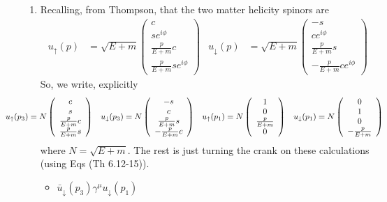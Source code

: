 \begin{enumerate}[label=\alph*)]
	\item Recalling, from Thompson, that the two matter helicity spinors are
	\begin{align}
	u_{\uparrow}(p)&=\sqrt{E+m}\left(\begin{array}{c} c\\se^{i\phi} \\\tfrac{p}{E+m}c \\\tfrac{p}{E+m}se^{i\phi} \end{array}\right) & u_{\downarrow}(p)&=\sqrt{E+m}\left(\begin{array}{c}-s\\ ce^{i\phi} \\\tfrac{p}{E+m}s \\ -\tfrac{p}{E+m}ce^{i\phi} \end{array}\right)
	\end{align}
	So, we write, explicitly 
	\begin{align}
	\hspace{-1.5cm} u_{\uparrow}(p_{3})&=N\left(\begin{array}{c} c\\s \\\tfrac{p}{E+m}c \\\tfrac{p}{E+m}s \end{array}\right) & u_{\downarrow}(p_{3})&=N\left(\begin{array}{c}-s\\ c \\\tfrac{p}{E+m}s \\ -\tfrac{p}{E+m}c \end{array}\right)&u_{\uparrow}(p_{1})&=N\left(\begin{array}{c} 1\\ 0 \\\tfrac{p}{E+m} \\ 0 \end{array}\right) & u_{\downarrow}(p_{1})&=N\left(\begin{array}{c} 0 \\ 1 \\ 0 \\ -\tfrac{p}{E+m} \end{array}\right)
	\end{align}
	where \(N=\sqrt{E+m}\).	The rest is just turning the crank on these calculations (using Eqs (Th 6.12-15)).
	\begin{itemize}
		\item \(\bar{u}_{\downarrow}(p_{3})\gamma^{\mu}u_{\downarrow}(p_{1})\)
		\begin{align}

\end{align}
\end{itemize}
\end{enumerate}
